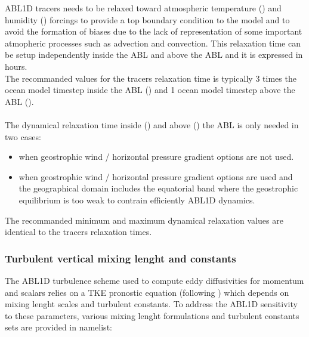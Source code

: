 \documentclass[../main/NEMO_manual]{subfiles}
\begin{document}
ABL1D tracers needs to be relaxed toward atmospheric temperature ()
and humidity () forcings to provide a top boundary condition to the model and to avoid the formation of biases due to the lack
of representation of some important atmopheric processes such as advection and convection.
This relaxation time can be setup independently inside the ABL and above the ABL and it is expressed in hours.\\
The recommanded values for the tracers relaxation time is typically 3 times the ocean model timestep inside the ABL ()
and 1 ocean model timestep above the ABL ().\\
\\
The dynamical relaxation time inside () and above () the ABL is only needed in two cases:
\begin{itemize}
  \item when geostrophic wind / horizontal pressure gradient options are not used.
  \item when geostrophic wind / horizontal pressure gradient options are used and the geographical domain includes the equatorial band
  where the geostrophic equilibrium is too weak to contrain efficiently ABL1D dynamics.
\end{itemize}
The recommanded minimum and maximum dynamical relaxation values are identical to the tracers relaxation times.\\

\subsubsection{Turbulent vertical mixing lenght and constants}

The ABL1D turbulence scheme used to compute eddy diffusivities for momentum and scalars relies on a TKE pronostic equation (following \citet{cuxart.bougeault_QJRMS00})
which depends on mixing lenght scales and turbulent constants.
To address the ABL1D sensitivity to these parameters, various mixing lenght formulations and turbulent constants sets are provided in namelist:
\end{document}
